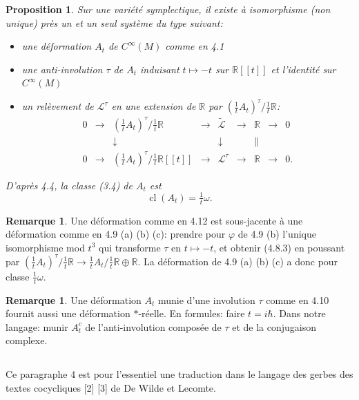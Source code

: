 \documentclass[11pt,a4paper]{article}
\theoremstyle{plain}
\newtheorem{proposition}[theorem]{Proposition}
\theoremstyle{definition}
\newtheorem{remark}[theorem]{Remarque}
\DeclareMathOperator{\cl}{cl}
\newcommand{\R}{\mathbb{R}}
\begin{document}
\begin{proposition}
Sur une vari\'et\'e symplectique, il existe \`a isomorphisme (non unique) pr\`es un et un seul syst\`eme du type suivant:
\begin{itemize}
\item[(a)] une d\'eformation $A_{t}$ de $C^{\infty}(M)$ comme en 4.1
\item[(b)] une anti-involution $\tau$ de $A_{t}$ induisant $t \mapsto -t$ sur $\R[[t]]$ et l'identit\'e sur $C^{\infty}(M)$
\item[(c)] un rel\`evement de $\mathcal{L}^{\tau}$ en une extension de $\R$ par $(\tfrac{1}{t}A_{t})^{\tau}/\tfrac{1}{t}\R$:
\[
\begin{array}{ccccccccc}
0 & \longrightarrow & (\tfrac{1}{t}A_{t})^{\tau}/\tfrac{1}{t}\R & \longrightarrow & \widetilde{\mathcal{L}} & \longrightarrow & \R & \longrightarrow & 0 \\
& & \downarrow & & \downarrow & & \| & & \\
0 & \longrightarrow & (\tfrac{1}{t}A_{t})^{\tau}/\tfrac{1}{t}\R[[t]] & \longrightarrow & \mathcal{L}^{\tau} & \longrightarrow & \R & \longrightarrow & 0.
\end{array}
\]
\end{itemize}
D'apr\`es 4.4, la classe (3.4) de $A_{t}$ est
\begin{equation}
\cl(A_{t}) = \tfrac{1}{t}\omega. \tag{4.12.1}
\end{equation}
\end{proposition}

\begin{remark}
Une d\'eformation comme en 4.12 est sous-jacente \`a une d\'eformation comme en 4.9 (a) (b) (c): prendre pour $\varphi$ de 4.9 (b) l'unique isomorphisme mod $t^{3}$ qui transforme $\tau$ en $t \mapsto -t$, et obtenir (4.8.3) en poussant par $(\tfrac{1}{t}A_{t})^{\tau}/\tfrac{1}{t}\R \to \tfrac{1}{t}A_{t}/\tfrac{1}{t}\R \oplus \R$. La d\'eformation de 4.9 (a) (b) (c) a donc pour classe $\tfrac{1}{t}\omega$.
\end{remark}

\begin{remark}
Une d\'eformation $A_{t}$ munie d'une involution $\tau$ comme en 4.10
fournit aussi une d\'eformation $*$-r\'eelle. En formules: faire $t = i\hbar$. Dans notre langage:
munir $A_{t}^{c}$ de l'anti-involution compos\'ee de $\tau$ et de la conjugaison complexe.
\end{remark}

\subsection{}
Ce paragraphe 4 est pour l'essentiel une traduction dans le langage des gerbes
des textes cocycliques [2] [3] de De Wilde et Lecomte.
\end{document}

